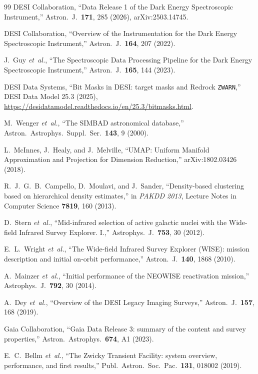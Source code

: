 \documentclass[aps,prd,twocolumn,superscriptaddress,nofootinbib,longbibliography,floatfix]{revtex4-2}
\newcommand{\etal}{\textit{et~al.}}
\newcommand{\ZWARN}{\texttt{ZWARN}}
\begin{document}
\begin{thebibliography}{99}
 DESI Collaboration,
  ``Data Release 1 of the Dark Energy Spectroscopic Instrument,''
  Astron.\ J.\ \textbf{171}, 285 (2026), arXiv:2503.14745.

 DESI Collaboration,
  ``Overview of the Instrumentation for the Dark Energy Spectroscopic
  Instrument,'' Astron.\ J.\ \textbf{164}, 207 (2022).

 J.~Guy \etal,
  ``The Spectroscopic Data Processing Pipeline for the Dark Energy
  Spectroscopic Instrument,'' Astron.\ J.\ \textbf{165}, 144 (2023).

 DESI Data Systems,
  ``Bit Masks in DESI: target masks and Redrock \ZWARN,''
  DESI Data Model 25.3 (2025),
  \url{https://desidatamodel.readthedocs.io/en/25.3/bitmasks.html}.

 M.~Wenger \etal,
  ``The SIMBAD astronomical database,''
  Astron.\ Astrophys.\ Suppl.\ Ser.\ \textbf{143}, 9 (2000).

 L.~McInnes, J.~Healy, and J.~Melville,
  ``UMAP: Uniform Manifold Approximation and Projection for Dimension
  Reduction,'' arXiv:1802.03426 (2018).

 R.~J.~G.~B.~Campello, D.~Moulavi, and J.~Sander,
  ``Density-based clustering based on hierarchical density estimates,''
  in \textit{PAKDD 2013}, Lecture Notes in Computer Science \textbf{7819},
  160 (2013).

 D.~Stern \etal,
  ``Mid-infrared selection of active galactic nuclei with the
  Wide-field Infrared Survey Explorer. I.,''
  Astrophys.\ J.\ \textbf{753}, 30 (2012).

 E.~L.~Wright \etal,
  ``The Wide-field Infrared Survey Explorer (WISE): mission description and
  initial on-orbit performance,'' Astron.\ J.\ \textbf{140}, 1868 (2010).

 A.~Mainzer \etal,
  ``Initial performance of the NEOWISE reactivation mission,''
  Astrophys.\ J.\ \textbf{792}, 30 (2014).

 A.~Dey \etal,
  ``Overview of the DESI Legacy Imaging Surveys,''
  Astron.\ J.\ \textbf{157}, 168 (2019).

 Gaia Collaboration,
  ``Gaia Data Release 3: summary of the content and survey properties,''
  Astron.\ Astrophys.\ \textbf{674}, A1 (2023).

 E.~C.~Bellm \etal,
  ``The Zwicky Transient Facility: system overview, performance, and first
  results,'' Publ.\ Astron.\ Soc.\ Pac.\ \textbf{131}, 018002 (2019).


\end{thebibliography}
\end{document}
